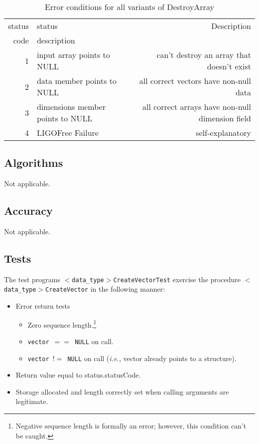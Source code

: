 \documentclass{article}
\providecommand{\ttm}{\tt}
\begin{document}
\begin{table}
\begin{tabular}{|r|l|r|}\hline
status&status&Description\\
code&description&\\\hline
1&input array points to NULL&can't destroy an array that doesn't
exist\\
2&data member points to NULL&all correct vectors have non-null data\\
3&dimensions member points to NULL&all correct arrays have non-null
dimension field\\
4&LIGOFree Failure&self-explanatory\\
\hline
\end{tabular}
\caption{Error conditions for all variants of DestroyArray}\label{tbl:DA}
\end{table}
                                
\subsection{Algorithms}

Not applicable.


\subsection{Accuracy}


Not applicable.

\subsection{Tests}


The test programs {\ttm $<$data\_type$>$CreateVectorTest\/} exercise
the procedure {\ttm $<$data\_type$>$CreateVector\/} in the following
manner: 
\begin{itemize}
\item Error return tests
\begin{itemize}
\item Zero sequence length.\footnote{Negative sequence length is
formally an error; however, this condition can't be caught.}
\item {\tt vector $==$ NULL\/} on call.
\item {\ttm *vector $!=$ NULL\/} on call ({\em i.e.,} vector already
points to a structure).
\end{itemize}
\item Return value equal to status.statusCode.
\item Storage allocated and length correctly set when calling
arguments are legitimate. 
\end{itemize}
\end{document}
